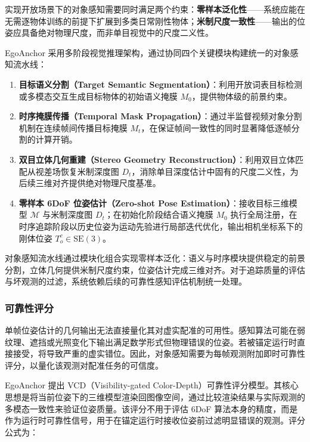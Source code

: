 \documentclass[review]{vgtc}
\begin{document}
实现开放场景下的对象感知需要同时满足两个约束：\textbf{零样本泛化性}------系统应能在无需逐物体训练的前提下扩展到多类日常刚性物体；\textbf{米制尺度一致性}------输出的位姿应具备绝对物理尺度，而非单目视觉中的尺度二义性。

EgoAnchor 采用多阶段视觉推理架构，通过协同四个关键模块构建统一的对象感知流水线：

\begin{enumerate}
  \item \textbf{目标语义分割（Target Semantic Segmentation）}：利用开放词表目标检测或多模态交互生成目标物体的初始语义掩膜 $M_0$，提供物体级的前景约束。
  \item \textbf{时序掩膜传播（Temporal Mask Propagation）}：通过半监督视频对象分割机制在连续帧间传播目标掩膜 $M_t$，在保证帧间一致性的同时显著降低逐帧分割的计算开销。
  \item \textbf{双目立体几何重建（Stereo Geometry Reconstruction）}：利用双目立体匹配从视差场恢复米制深度图 $D_t$，消除单目深度估计中固有的尺度二义性，为后续三维对齐提供绝对物理尺度基准。
  \item \textbf{零样本 6DoF 位姿估计（Zero-shot Pose Estimation）}：接收目标三维模型 $\mathcal{M}$ 与米制深度图 $D_t$；在初始化阶段结合语义掩膜 $M_0$ 执行全局注册，在时序追踪阶段以历史位姿为运动先验进行局部迭代优化，输出相机坐标系下的刚体位姿 $T_o^c \in \mathrm{SE}(3)$。
\end{enumerate}

对象感知流水线通过模块化组合实现零样本泛化：语义与时序模块提供稳定的前景分割，立体几何提供米制尺度约束，位姿估计完成三维对齐。对于追踪质量的评估与坏观测的过滤，系统依赖后续的可靠性感知评估机制统一处理。

\subsubsection{可靠性评分}\label{sec:reliability}


单帧位姿估计的几何输出无法直接量化其对虚实配准的可用性。感知算法可能在弱纹理、遮挡或光照变化下输出满足数学形式但物理错误的位姿。若被锚定运行时直接接受，将导致严重的虚实错位。因此，对象感知需要为每帧观测附加即时可靠性评分，以量化该观测对配准任务的可信度。

EgoAnchor 提出 VCD（Visibility-gated Color-Depth）可靠性评分模型。其核心思想是将当前位姿下的三维模型渲染回图像空间，通过比较渲染结果与实际观测的多模态一致性来验证位姿质量。该评分不用于评估 6DoF 算法本身的精度，而是作为运行时可靠性信号，用于在锚定运行时接收位姿前过滤明显错误的观测。评分公式为：
\end{document}
